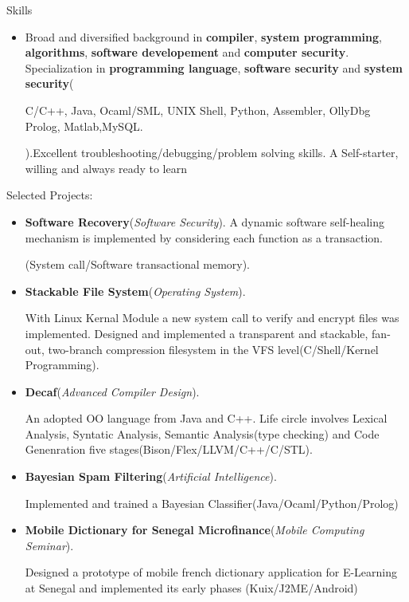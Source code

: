 \documentclass[11pt,oneside]{article}
\newenvironment{ressection}[1]{
	\vspace{4pt}
	{\fontfamily{phv}\selectfont\Large#1}
	\begin{itemize}
	\vspace{3pt}
}{
	\end{itemize}
}
\newcommand{\resitem}[1]{
	\vspace{-4pt}
	\item \begin{flushleft} #1 \end{flushleft}
}
\begin{document}
\begin{ressection}{Skills}
\resitem{Broad and diversified background in \textbf{compiler},  \textbf{system programming}, \textbf{algorithms}, \textbf{software developement} and \textbf{computer security}. Specialization in \textbf{programming language}, \textbf{software security} and \textbf{system security}(\begin{small}C/C++, Java, Ocaml/SML, UNIX Shell, Python, Assembler, OllyDbg Prolog, Matlab,MySQL.\end{small}).Excellent troubleshooting/debugging/problem solving skills. A Self-starter, willing and always ready to learn}

\end{ressection}
\begin{ressection}{Selected Projects:}
  \resitem{\textbf{Software Recovery}(\textit{Software Security}). A dynamic software self-healing mechanism is implemented by considering each function as a transaction. \begin{small}(System call/Software transactional memory).\end{small}}

	\resitem{\textbf{Stackable File System}(\textit{Operating System}). \begin{small}With Linux Kernal Module a new system call to verify and encrypt files was implemented. Designed and implemented a transparent and stackable, fan-out, two-branch compression filesystem in the VFS level(C/Shell/Kernel Programming).\end{small}}

	\resitem{\textbf{Decaf}(\textit{Advanced Compiler Design}). \begin{small}An adopted OO language from Java and C++. Life circle involves Lexical Analysis, Syntatic Analysis, Semantic Analysis(type checking) and Code Genenration five stages(Bison/Flex/LLVM/C++/C/STL).\end{small}}

	\resitem{\textbf{Bayesian Spam Filtering}(\textit{Artificial Intelligence}). \begin{small}Implemented and trained a Bayesian Classifier(Java/Ocaml/Python/Prolog)\end{small}}

	\resitem{\textbf{Mobile Dictionary for Senegal Microfinance}(\textit{Mobile Computing Seminar}). \begin{small}Designed a prototype of mobile french dictionary application for E-Learning at Senegal and implemented its early phases (Kuix/J2ME/Android)\end{small}}



\end{ressection}
\end{document}
